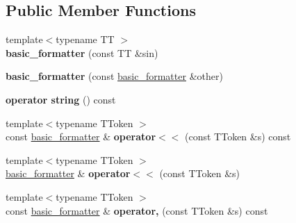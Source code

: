 \subsection*{Public Member Functions}
\begin{DoxyCompactItemize}
\item 
\hypertarget{singleton_assimp_1_1_formatter_1_1basic__formatter_a7d1da702030a65573f55998b82bbdfe6}{{\footnotesize template$<$typename T\+T $>$ }\\{\bfseries basic\+\_\+formatter} (const T\+T \&sin)}\label{singleton_assimp_1_1_formatter_1_1basic__formatter_a7d1da702030a65573f55998b82bbdfe6}

\item 
\hypertarget{singleton_assimp_1_1_formatter_1_1basic__formatter_aba0675631724e150316de1457acc0395}{{\bfseries basic\+\_\+formatter} (const \hyperlink{singleton_assimp_1_1_formatter_1_1basic__formatter}{basic\+\_\+formatter} \&other)}\label{singleton_assimp_1_1_formatter_1_1basic__formatter_aba0675631724e150316de1457acc0395}

\item 
\hypertarget{singleton_assimp_1_1_formatter_1_1basic__formatter_a282c248c3ba6200e2f5a1f4bc27d77cc}{{\bfseries operator string} () const }\label{singleton_assimp_1_1_formatter_1_1basic__formatter_a282c248c3ba6200e2f5a1f4bc27d77cc}

\item 
\hypertarget{singleton_assimp_1_1_formatter_1_1basic__formatter_a686ed7e8ffff4d0ba0620359e32b21ca}{{\footnotesize template$<$typename T\+Token $>$ }\\const \hyperlink{singleton_assimp_1_1_formatter_1_1basic__formatter}{basic\+\_\+formatter} \& {\bfseries operator$<$$<$} (const T\+Token \&s) const }\label{singleton_assimp_1_1_formatter_1_1basic__formatter_a686ed7e8ffff4d0ba0620359e32b21ca}

\item 
\hypertarget{singleton_assimp_1_1_formatter_1_1basic__formatter_a7bb921e0b9a62efe237a2e23626d1f60}{{\footnotesize template$<$typename T\+Token $>$ }\\\hyperlink{singleton_assimp_1_1_formatter_1_1basic__formatter}{basic\+\_\+formatter} \& {\bfseries operator$<$$<$} (const T\+Token \&s)}\label{singleton_assimp_1_1_formatter_1_1basic__formatter_a7bb921e0b9a62efe237a2e23626d1f60}

\item 
\hypertarget{singleton_assimp_1_1_formatter_1_1basic__formatter_a7f240e8b5f098bf9267f97dc83b988a0}{{\footnotesize template$<$typename T\+Token $>$ }\\const \hyperlink{singleton_assimp_1_1_formatter_1_1basic__formatter}{basic\+\_\+formatter} \& {\bfseries operator,} (const T\+Token \&s) const }\label{singleton_assimp_1_1_formatter_1_1basic__formatter_a7f240e8b5f098bf9267f97dc83b988a0}


\end{DoxyCompactItemize}
